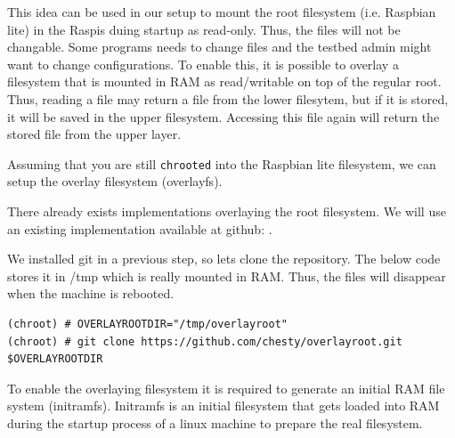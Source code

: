 This idea can be used in our setup to mount the root filesystem (i.e. Raspbian
lite) in the \ac{Raspi}s duing startup as read-only. Thus, the files will not
be changable. Some programs needs to change files and the testbed admin might
want to change configurations. To enable this, it is possible to
overlay a filesystem that is mounted in \ac{RAM} as read/writable on top of
the regular root. Thus, reading a file may return a file from the lower filesytem,
but if it is stored, it will be saved in the upper filesystem. Accessing this file
again will return the stored file from the upper layer.



%
%
%
%

Assuming that you are still \texttt{chrooted} into the Raspbian lite filesystem, we
can setup the overlay filesystem (overlayfs).

There already exists implementations overlaying the root filesystem. We will
use an existing implementation
available at github: \cite{overlayroot}.

We installed git in a previous step, so lets clone the repository. The below
code stores it in /tmp which is really mounted in \ac{RAM}. Thus, the files
will disappear when the machine is rebooted.

\begin{lstlisting}[]
(chroot) # OVERLAYROOTDIR="/tmp/overlayroot"
(chroot) # git clone https://github.com/chesty/overlayroot.git $OVERLAYROOTDIR
\end{lstlisting}
\FloatBarrier
\vspace{-5mm}

To enable the overlaying filesystem it is required to generate an initial \ac{RAM}
file system (initramfs). Initramfs is an initial filesystem that gets loaded into
\ac{RAM} during the startup process of a linux machine to prepare the real
filesystem.

